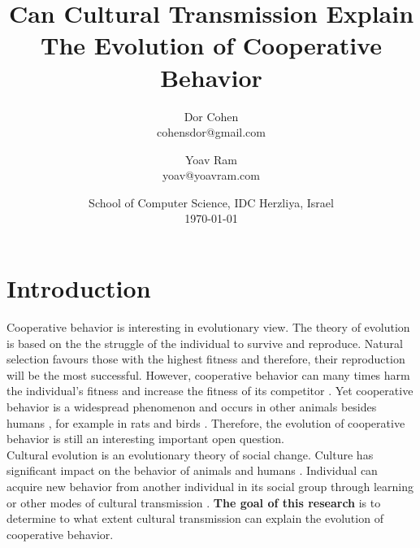 \documentclass{article}
\title{Can Cultural Transmission Explain The Evolution of Cooperative Behavior}
\author{Dor Cohen \\ cohensdor@gmail.com \and Yoav Ram \\ yoav@yoavram.com}
\date{School of Computer Science, IDC Herzliya, Israel\\ \today}
\begin{document}
\maketitle

\section*{Introduction}
Cooperative behavior is interesting in evolutionary view. The theory of evolution is based on the the struggle of the individual to survive and reproduce. Natural selection favours those with the highest fitness and therefore, their reproduction will be the most successful. However, cooperative behavior can many times harm the individual's fitness and increase the fitness of its competitor \cite{axelrod1981evolution}. Yet cooperative behavior is a widespread phenomenon and occurs in other animals besides humans \cite{dugatkin1997cooperation}, for example in rats \cite{rice1962altruism} and birds \cite{krams2008experimental}.
Therefore, the evolution of cooperative behavior is still an interesting important open question.
\\Cultural evolution is an evolutionary theory of social change. Culture has significant impact on the behavior of animals \cite{bonner2018evolution} and humans \cite{ihara2004cultural,jeong2018bronze}. Individual can acquire new behavior from another individual in its social group  through learning or other modes of cultural transmission \cite{richerson2008not}.
\textbf{The goal of this research} is to determine to what extent cultural transmission can explain the evolution of cooperative behavior.
\end{document}

